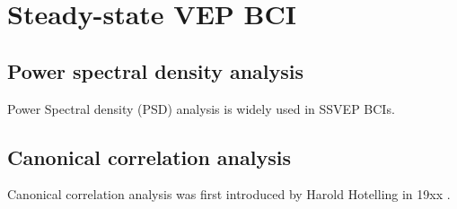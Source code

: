 \section{Steady-state VEP BCI}
\label{sec:SSVEP_detection}
\subsection{Power spectral density analysis}
Power Spectral density (PSD) analysis is widely used in SSVEP BCIs\cite{bin2009cca}.
\subsection{Canonical correlation analysis}
Canonical correlation analysis was first introduced by Harold Hotelling in 19xx .